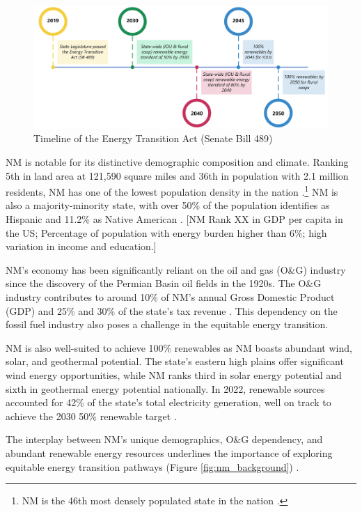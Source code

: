 \documentclass[12pt,twoside,letterpaper]{article}
\begin{document}
\begin{figure}[!ht]
    \centering
    \includegraphics[width=1\textwidth]{figures/nm_eta.png}
    \caption{Timeline of the Energy Transition Act (Senate Bill 489)}
    \label{fig:nm_eta}
\end{figure}

NM is notable for its distinctive demographic composition and climate. Ranking 5th in land area at 121,590 square miles and 36th in population with 2.1 million residents, NM has one of the lowest population density in the nation \parencite{uscensus2022}.\footnote{NM is the 46th most densely populated state in the nation \parencite{uscensus2022}.} NM is also a majority-minority state, with over 50\% of the population identifies as Hispanic and 11.2\% as Native American \parencite{uscensus2020}. [NM Rank XX in GDP per capita in the US; Percentage of population with energy burden higher than 6\%; high variation in income and education.]

NM's economy has been significantly reliant on the oil and gas (O\&G) industry since the discovery of the Permian Basin oil fields in the 1920s. The O\&G industry contributes to around 10\% of NM's annual Gross Domestic Product (GDP) and 25\% and 30\% of the state's tax revenue \parencite{eia2023nm, nmlegislative2023}. This dependency on the fossil fuel industry also poses a challenge in the equitable energy transition.

NM is also well-suited to achieve 100\% renewables as NM boasts abundant wind, solar, and geothermal potential. The state's eastern high plains offer significant wind energy opportunities, while NM ranks third in solar energy potential and sixth in geothermal energy potential nationally. In 2022, renewable sources accounted for 42\% of the state's total electricity generation, well on track to achieve the 2030 50\% renewable target \parencite{eia2023energy}.

The interplay between NM's unique demographics, O\&G dependency, and abundant renewable energy resources underlines the importance of exploring equitable energy transition pathways (Figure \ref{fig:nm_background}) .
\end{document}
